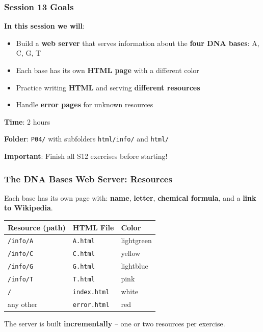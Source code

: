 \documentclass[xcolor=table]{beamer}
\begin{document}
\begin{frame}
\frametitle{Session 13 Goals}

\textbf{In this session we will}:

\begin{itemize}
\item Build a \textbf{web server} that serves information about the \textbf{four DNA bases}: A, C, G, T
\item Each base has its own \textbf{HTML page} with a different color
\item Practice writing \textbf{HTML} and serving \textbf{different resources}
\item Handle \textbf{error pages} for unknown resources
\end{itemize}

\vspace{0.4cm}

\textbf{Time}: 2 hours

\vspace{0.2cm}

\textbf{Folder}: \texttt{P04/} with subfolders \texttt{html/info/} and \texttt{html/}

\vspace{0.2cm}

\textbf{Important}: Finish all S12 exercises before starting!

\end{frame}

\begin{frame}
\frametitle{The DNA Bases Web Server: Resources}

Each base has its own page with: \textbf{name}, \textbf{letter}, \textbf{chemical formula}, and a \textbf{link to Wikipedia}.

\vspace{0.2cm}

\begingroup\small
\begin{center}
\begin{tabular}{|l|l|l|}
\hline
\textbf{Resource (path)} & \textbf{HTML File} & \textbf{Color} \\
\hline
\texttt{/info/A} & \texttt{A.html} & lightgreen \\
\hline
\texttt{/info/C} & \texttt{C.html} & yellow \\
\hline
\texttt{/info/G} & \texttt{G.html} & lightblue \\
\hline
\texttt{/info/T} & \texttt{T.html} & pink \\
\hline
\texttt{/} & \texttt{index.html} & white \\
\hline
any other & \texttt{error.html} & red \\
\hline
\end{tabular}
\end{center}
\endgroup

\vspace{0.2cm}

The server is built \textbf{incrementally} -- one or two resources per exercise.

\end{frame}
\end{document}
